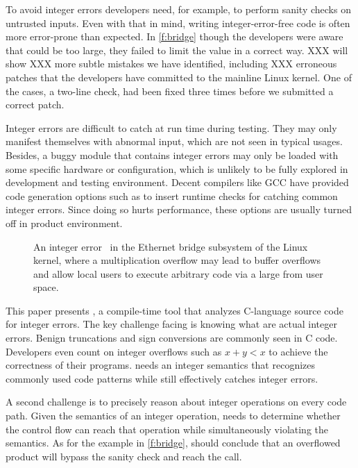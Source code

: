 To avoid integer errors developers need, for example, to perform
sanity checks on untrusted inputs.  Even with that in mind, writing
integer-error-free code is often more error-prone than expected.
In \autoref{f:bridge} though the developers were aware that 
could be too large, they failed to limit the value in a correct
way.  XXX will show XXX more subtle mistakes we have identified,
including XXX erroneous patches that the developers have committed
to the mainline Linux kernel.  One of the cases, a two-line check,
had been fixed three times before we submitted a correct patch.

Integer errors are difficult to catch at run time during testing.
They may only manifest themselves with abnormal input, which are
not seen in typical usages.  Besides, a buggy module that contains
integer errors may only be loaded with some specific hardware or
configuration, which is unlikely to be fully explored in development
and testing environment.  Decent compilers like GCC have provided
code generation options such as  to insert runtime
checks for catching common integer errors.  Since doing so hurts
performance, these options are usually turned off in product
environment.
\fi

\begin{figure}[t]
\centering

\vspace{-1em}
\caption{An integer error~\cite[CVE-2006-5751]{cve} in the Ethernet
bridge subsystem of the Linux kernel, where a multiplication overflow
may lead to buffer overflows and allow local users to execute
arbitrary code via a large  from user space.}
\label{f:bridge}
\end{figure}

This paper presents \sys, a compile-time tool that analyzes C-language
source code for integer errors.
%
The key challenge facing \sys is knowing what are actual integer
errors.  Benign truncations and sign conversions are commonly seen
in C code.  Developers even count on integer overflows such as $x
+ y < x$ to achieve the correctness of their programs.  \sys needs
an integer semantics that recognizes commonly used code patterns
while still effectively catches integer errors.

A second challenge is to precisely reason about integer operations
on every code path.  Given the semantics of an integer operation,
\sys needs to determine whether the control flow can reach that
operation while simultaneously violating the semantics.  As for the
example in \autoref{f:bridge}, \sys should conclude that an overflowed
product  will bypass the sanity check and reach the
 call.

